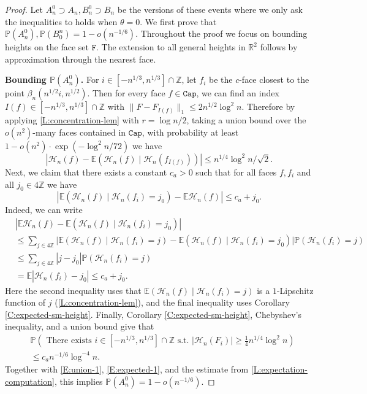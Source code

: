 \documentclass[11pt,twoside]{amsart}
\theoremstyle{plain}
\numberwithin{quest}{section}
\theoremstyle{remark}
\numberwithin{rem}{section}
\theoremstyle{definition}
\newcommand{\Z}{\mathbb{Z}}
\newcommand{\R}{\mathbb{R}}
\renewcommand{\P}{\mathbb{P}}
\newcommand{\E}{\mathbb{E}}
\newcommand{\cH}{\mathcal{H}}
\renewcommand{\tt}[1]{{\mathtt{#1}}}
\begin{document}
	\begin{proof}
		Let $A_n^0 \supset A_n, B_n^0 \supset B_n$ be the versions of these events where we only ask the inequalities to holds when $\theta = 0$. We first prove that $\P(A_n^0), \P(B^n_0) = 1 - o(n^{-1/6})$. Throughout the proof we focus on bounding heights on the face set $\tt{F}$. The extension to all general heights in $\R^2$ follows by approximation through the nearest face.
		
		\textbf{Bounding $\P(A_n^0)$.} \qquad For $i \in [-n^{1/3}, n^{1/3}] \cap \Z$, let $f_i$ be the $c$-face closest to the point $\beta_n (n^{1/2} i, n^{1/2})$. Then for every face $f \in \tt{Cap}$, we can find an index $I(f) \in [-n^{1/3}, n^{1/3}] \cap \Z$ with $\|F - F_{I(f)}\|_1 \le 2n^{1/2} \log^2 n$. Therefore by applying \cref{L:concentration-lem} with $r = \log n /2$, taking a union bound over the $o(n^2)$-many faces contained in $\tt{Cap}$, with probability at least $1 - o(n^2) \cdot \exp(-\log^2 n/72)$ we have
		\begin{equation}
			\label{E:union-1}
			|\mathcal{H}_n(f) - \E (\cH_n(f) \mid \cH_n(f_{I(f)}))| \le n^{1/4} \log^2 n/\sqrt{2}.
		\end{equation}
		Next, we claim that there exists a constant $c_a > 0$ such that for all faces $f, f_i$ and all $j_0 \in 4 \Z$ we have
		\begin{equation}
			\label{E:expected-1}
			|\E (\cH_n(f) \mid \cH_n(f_i) = j_0) - \E \cH_n(f)| \le c_a + j_0.
		\end{equation}
		Indeed, we can write
		\begin{align*}
			&|\E \cH_n(f) - \E (\cH_n(f) \mid \cH_n(f_i) = j_0)| \\
			&\le \sum_{j \in 4 \Z } \Big|\E (\cH_n(f) \mid \cH_n(f_i) = j) - \E (\cH_n(f) \mid \cH_n(f_i) = j_0)\Big| \P(\cH_n(f_i) = j) \\
			&\le \sum_{j \in 4 \Z } |j-j_0| \P(\cH_n(f_i) = j) \\
			&= \E|\cH_n(f_i) - j_0| \le c_a + j_0. 
		\end{align*}
		Here the second inequality uses that $\E (\cH_n(f) \mid \cH_n(f_i) = j)$ is a $1$-Lipschitz function of $j$ (\cref{L:concentration-lem}), and the final inequality uses Corollary \ref{C:expected-sm-height}. Finally, Corollary \ref{C:expected-sm-height}, Chebyshev's inequality, and a union bound give that
		\begin{equation}
			\label{E:Hnfi}
			\begin{split}
				&\P(\text{ There exists } i \in [-n^{1/3}, n^{1/3}] \cap \Z \text{ s.t. } |\mathcal H_n(F_i)| \ge \tfrac{1}{4} n^{1/4} \log^2 n) \\
				&\le c_a n^{-1/6} \log^{-4} n.  
			\end{split}
		\end{equation}
		Together with \eqref{E:union-1}, \eqref{E:expected-1}, and the estimate from \cref{L:expectation-computation}, this implies $\P(A_n^0) = 1 - o(n^{-1/6})$.
		

\end{proof}
\end{document}
